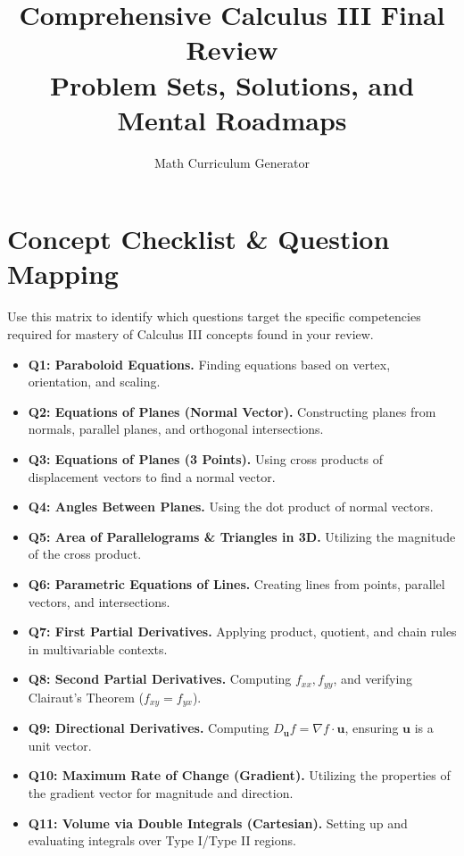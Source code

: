 \documentclass[11pt]{article}
\title{Comprehensive Calculus III Final Review \\ \large Problem Sets, Solutions, and Mental Roadmaps}
\author{Math Curriculum Generator}
\date{}
\begin{document}
\maketitle
\tableofcontents
\newpage

\section{Concept Checklist \& Question Mapping}

Use this matrix to identify which questions target the specific competencies required for mastery of Calculus III concepts found in your review.

\begin{itemize}
    \item \textbf{Q1: Paraboloid Equations.} Finding equations based on vertex, orientation, and scaling.
    \item \textbf{Q2: Equations of Planes (Normal Vector).} Constructing planes from normals, parallel planes, and orthogonal intersections.
    \item \textbf{Q3: Equations of Planes (3 Points).} Using cross products of displacement vectors to find a normal vector.
    \item \textbf{Q4: Angles Between Planes.} Using the dot product of normal vectors.
    \item \textbf{Q5: Area of Parallelograms \& Triangles in 3D.} Utilizing the magnitude of the cross product.
    \item \textbf{Q6: Parametric Equations of Lines.} Creating lines from points, parallel vectors, and intersections.
    \item \textbf{Q7: First Partial Derivatives.} Applying product, quotient, and chain rules in multivariable contexts.
    \item \textbf{Q8: Second Partial Derivatives.} Computing $f_{xx}, f_{yy}$, and verifying Clairaut's Theorem ($f_{xy} = f_{yx}$).
    \item \textbf{Q9: Directional Derivatives.} Computing $D_{\mathbf{u}}f = \nabla f \cdot \mathbf{u}$, ensuring $\mathbf{u}$ is a unit vector.
    \item \textbf{Q10: Maximum Rate of Change (Gradient).} Utilizing the properties of the gradient vector for magnitude and direction.
    \item \textbf{Q11: Volume via Double Integrals (Cartesian).} Setting up and evaluating integrals over Type I/Type II regions.

\end{itemize}
\end{document}
